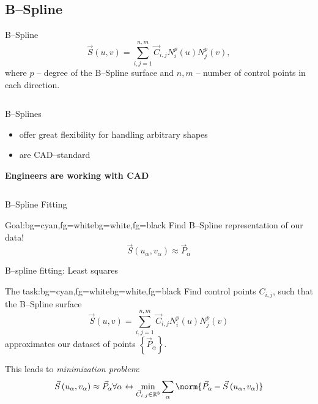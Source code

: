 \subsection{B--Spline}
\begin{frame}{B--Spline}
\begin{equation*}
\vec{S}\left(u,v\right)=\sum\limits_{i,j=1}^{n,m} \vec{C}_{i,j} N_i^p\left(u\right) N_j^p\left(v\right),
\end{equation*}
where $p$ -- degree of the B--Spline surface and $n,m$ -- number of control points in each direction.
\begin{columns}
\begin{column}{.45\textwidth}
B--Splines
\begin{itemize}
\item offer great flexibility for handling arbitrary shapes
\item are CAD--standard
\end{itemize}
\textbf{Engineers are working with CAD}
\end{column}
\begin{column}{.45\textwidth}

\end{column}
\end{columns}
\end{frame}

\begin{frame}{B--Spline Fitting}

\begin{variableblock}{Goal:}{bg=cyan,fg=white}{bg=white,fg=black}
Find B--Spline representation of our data!\\
\begin{equation*}
\vec{S}\left(u_\alpha,v_\alpha\right) \approx \vec{P}_{\alpha} 
\end{equation*}
\end{variableblock}

\end{frame}

\begin{frame}{B--spline fitting: Least squares}
\begin{variableblock}{The task:}{bg=cyan,fg=white}{bg=white,fg=black}
Find control points $C_{i,j}$, such that the B--Spline surface
\begin{equation*}
\vec{S}\left(u,v\right)=\sum\limits_{i,j=1}^{n,m} \vec{C}_{i,j} N_i^p\left(u\right) N_j^p\left(v\right)
\end{equation*}
approximates our dataset of points $\left\lbrace \vec{P}_{\alpha} \right\rbrace $. 
\end{variableblock}

This leads to \textit{minimization problem}:
\begin{equation*}
\vec{S}\left(u_\alpha,v_\alpha\right) \approx \vec{P}_{\alpha} \forall \alpha \leftrightarrow 
\underset{\vec{C}_{i,j}\in \mathbb{R}^3}{\min} \sum\limits_\alpha \norm{\vec{P}_{\alpha}-\vec{S}\left(u_\alpha,v_\alpha\right)}
\end{equation*}
\end{frame}

